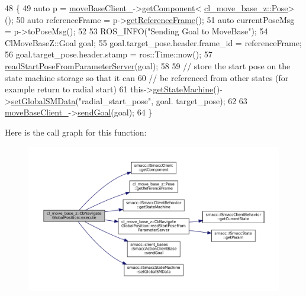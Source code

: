 \begin{DoxyCode}
48 \{
49   \textcolor{keyword}{auto} p = \hyperlink{classcl__move__base__z_1_1CbMoveBaseClientBehaviorBase_ab2ef219464cfac8659b4a87c8d0db6d5}{moveBaseClient\_}->\hyperlink{classsmacc_1_1ISmaccClient_adef78db601749ca63c19e74a27cb88cc}{getComponent}<
      \hyperlink{classcl__move__base__z_1_1Pose}{cl\_move\_base\_z::Pose}>();
50   \textcolor{keyword}{auto} referenceFrame = p->\hyperlink{classcl__move__base__z_1_1Pose_af8c2dc151e74aa8da6b283d1c8563051}{getReferenceFrame}();
51   \textcolor{keyword}{auto} currentPoseMsg = p->toPoseMsg();
52 
53   ROS\_INFO(\textcolor{stringliteral}{"Sending Goal to MoveBase"});
54   ClMoveBaseZ::Goal goal;
55   goal.target\_pose.header.frame\_id = referenceFrame;
56   goal.target\_pose.header.stamp = ros::Time::now();
57   \hyperlink{classcl__move__base__z_1_1CbNavigateGlobalPosition_a868b25f238e3781c9a2e44b4e1502fcc}{readStartPoseFromParameterServer}(goal);
58 
59   \textcolor{comment}{// store the start pose on the state machine storage so that it can}
60   \textcolor{comment}{// be referenced from other states (for example return to radial start)}
61   this->\hyperlink{classsmacc_1_1ISmaccClientBehavior_a9d55a85bf0a920033805a3c050de2019}{getStateMachine}()->\hyperlink{classsmacc_1_1ISmaccStateMachine_a8588f9e580fbb95b53e2bd2ca3ff1f98}{setGlobalSMData}(\textcolor{stringliteral}{"radial\_start\_pose"}, goal.
      target\_pose);
62 
63   \hyperlink{classcl__move__base__z_1_1CbMoveBaseClientBehaviorBase_ab2ef219464cfac8659b4a87c8d0db6d5}{moveBaseClient\_}->\hyperlink{classsmacc_1_1client__bases_1_1SmaccActionClientBase_a9c47a5094ac8afb01680307fe5eca922}{sendGoal}(goal);
64 \}
\end{DoxyCode}
Here is the call graph for this function\+:
\nopagebreak
\begin{figure}[H]
\begin{center}
\leavevmode
\includegraphics[width=350pt]{classcl__move__base__z_1_1CbNavigateGlobalPosition_a0b8525ea9e4388b27cb1f9b1e06a3b63_cgraph}
\end{center}
\end{figure}
